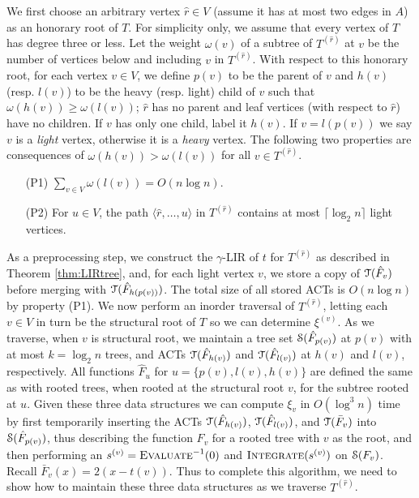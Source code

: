\documentclass[11pt]{article}
\def\TT{\EuScript{T}}
\def\evali{\mathop{\mbox{\textsc{Evaluate}}}^{-1}}
\def\integrate{\mathop{\textsc{Integrate}}}
\newcommand{\hF}{\hat{F}}
\renewcommand{\c}[1]{\ensuremath{\EuScript{#1}}}
\begin{document}
We first choose an arbitrary vertex $\hat{r} \in V$ (assume it has at most two edges in $A$) as an honorary root of $T$.  For simplicity only, we assume that every vertex of $T$ has degree three or less.  
Let the weight $\omega(v)$ of a subtree of $T^{(\hat{r})}$ at $v$ be the number of vertices below and including $v$ in $T^{(\hat{r})}$.
With respect to this honorary root, for each vertex $v \in V$, we define $p(v)$ to be the parent of $v$ and $h(v)$ (resp. $l(v)$) to be the heavy (resp. light) child of $v$ such that $\omega(h(v)) \geq \omega(l(v))$; $\hat{r}$ has no parent and leaf vertices (with respect to $\hat{r}$) have no children.  
If $v$ has only one child, label it $h(v)$. 
If $v = l(p(v))$ we say $v$ is a \emph{light} vertex, otherwise it is a \emph{heavy} vertex.
The following two properties are consequences of $\omega(h(v)) > \omega(l(v))$ for all $v \in T^{(\hat{r})}$.
\begin{itemize}
\vspace{-.1in}
\item[(P1)] $\sum_{v \in V} \omega(l(v)) = O(n \log n)$.  
\vspace{-.1in}
\item[(P2)] For $u \in V$, the path $\langle \hat{r}, \ldots, u \rangle$ in $T^{(\hat{r})}$ contains at most $\lceil\log_2 n\rceil$ light vertices.
\end{itemize}

As a preprocessing step, we construct the $\gamma$-LIR of $t$ for $T^{(\hat{r})}$ as described in Theorem \ref{thm:LIRtree}, and, for each light vertex $v$, we store a copy of $\TT(\hF_v)$ before merging with $\TT(\hF_{h(p(v))})$.  The total size of all stored ACTs is $O(n \log n)$ by property (P1).  
We now perform an inorder traversal of $T^{(\hat{r})}$, letting each $v \in V$ in turn be the structural root of $T$ so we can determine $\xi^{(v)}$.  
As we traverse, when $v$ is structural root, we maintain a tree set $\c{S}(\hF_{p(v)})$ at $p(v)$ with at most $k = \log_2 n$ trees, and ACTs $\c{T}(\hF_{h(v)})$ and $\c{T}(\hF_{l(v)})$ at $h(v)$ and $l(v)$, respectively.  
All functions $\hF_u$ for $u = \{p(v), l(v), h(v)\}$ are defined the same as with rooted trees, when rooted at the structural root $v$, for the subtree rooted at $u$.   
Given these three data structures we can compute $\xi_v$ in $O(\log^3 n)$ time by first temporarily inserting the ACTs $\TT(\hF_{h(v)})$, $\TT(\hF_{l(v)})$, and $\TT(\bar{F}_v)$ into $\c{S}(\hF_{p(v)})$, thus describing the function $F_v$ for a rooted tree with $v$ as the root, and then performing an $s^{(v)} = \evali(0)$ and $\integrate(s^{(v)})$ on $\c{S}(F_v)$.  Recall $\bar{F}_v(x) = 2(x-t(v))$.  
Thus to complete this algorithm, we need to show how to maintain these three data structures as we traverse $T^{(\hat{r})}$.  
\end{document}
